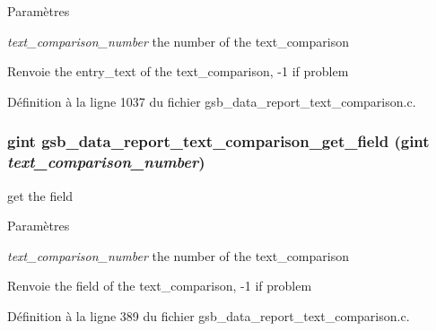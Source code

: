 \begin{DoxyParams}{Paramètres}
\item[{\em text\_\-comparison\_\-number}]the number of the text\_\-comparison\end{DoxyParams}
\begin{DoxyReturn}{Renvoie}
the entry\_\-text of the text\_\-comparison, -\/1 if problem 
\end{DoxyReturn}


Définition à la ligne 1037 du fichier gsb\_\-data\_\-report\_\-text\_\-comparison.c.

\subsubsection[{gsb\_\-data\_\-report\_\-text\_\-comparison\_\-get\_\-field}]{\setlength{\rightskip}{0pt plus 5cm}gint gsb\_\-data\_\-report\_\-text\_\-comparison\_\-get\_\-field (gint {\em text\_\-comparison\_\-number})}\label{gsb__data__report__text__comparison_8c_aa16049f62bdf58790d86880cbb500d0f}
get the field


\begin{DoxyParams}{Paramètres}
\item[{\em text\_\-comparison\_\-number}]the number of the text\_\-comparison\end{DoxyParams}
\begin{DoxyReturn}{Renvoie}
the field of the text\_\-comparison, -\/1 if problem 
\end{DoxyReturn}


Définition à la ligne 389 du fichier gsb\_\-data\_\-report\_\-text\_\-comparison.c.

